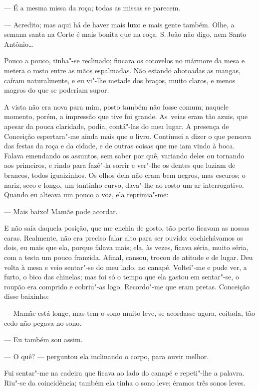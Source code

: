 \begin{linenumbers}
--- É a mesma missa da roça; todas as missas se parecem.

--- Acredito; mas aqui há de haver mais luxo e mais gente também. Olhe, a
semana santa na Corte é mais bonita que na roça. S.\,João não digo, nem
Santo Antônio\ldots{}

Pouco a pouco, tinha"-se reclinado; fincara os cotovelos no mármore da
mesa e metera o rosto entre as mãos espalmadas. Não estando abotoadas as
mangas, caíram naturalmente, e eu vi"-lhe metade dos braços, muito
claros, e menos magros do que se poderiam supor.

A vista não era nova para mim, posto também não fosse comum; naquele
momento, porém, a impressão que tive foi grande. As~veias eram tão
azuis, que apesar da pouca claridade, podia, contá"-las do meu lugar. A
presença de Conceição espertara"-me ainda mais que o livro. Continuei a
dizer o que pensava das festas da roça e da cidade, e de outras coisas
que me iam vindo à boca. Falava emendando os assuntos, sem saber por
quê, variando deles ou tornando aos primeiros, e rindo para fazê"-la
sorrir e ver"-lhe os dentes que luziam de brancos, todos iguaizinhos. Os
olhos dela não eram bem negros, mas escuros; o nariz, seco e longo, um
tantinho curvo, dava"-lhe ao rosto um ar interrogativo. Quando eu alteava
um pouco a voz, ela reprimia"-me:

--- Mais baixo! Mamãe pode acordar.

E não saía daquela posição, que me enchia de gosto, tão perto ficavam as
nossas caras. Realmente, não era preciso falar alto para ser ouvido:
cochichávamos os dois, eu mais que ela, porque falava mais; ela, às
vezes, ficava séria, muito séria, com a testa um pouco franzida. Afinal,
cansou, trocou de atitude e de lugar. Deu volta à mesa e veio sentar"-se
do meu lado, no canapé. Voltei"-me e pude ver, a furto, o bico das
chinelas; mas foi só o tempo que ela gastou em sentar"-se, o roupão era
comprido e cobriu"-as logo. Recordo"-me que eram pretas. Conceição disse
baixinho:

--- Mamãe está longe, mas tem o sono muito leve, se acordasse agora,
coitada, tão cedo não pegava no sono.

--- Eu também sou assim.

--- O quê? --- perguntou ela inclinando o corpo, para ouvir melhor.

Fui sentar"-me na cadeira que ficava ao lado do canapé e repeti"-lhe a
palavra. Riu"-se da coincidência; também ela tinha o sono leve; éramos
três sonos leves.


\end{linenumbers}
